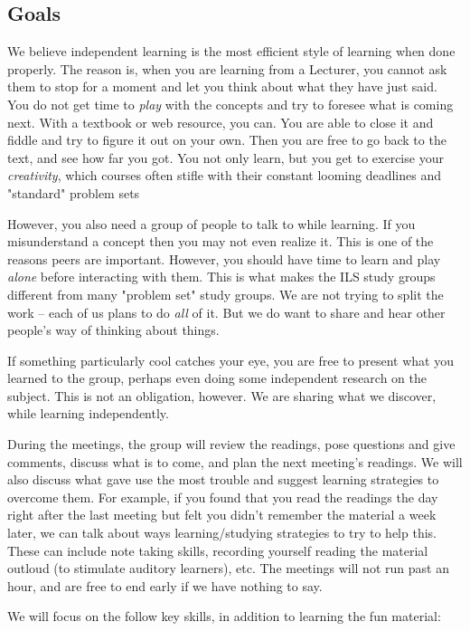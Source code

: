 \documentclass[mpinclude=true]{scrartcl}
\begin{document}
\subsection{Goals}


We believe independent learning is the most efficient style of
learning when done properly.  The reason is, when you are learning
from a Lecturer, you cannot ask them to stop for a moment and let you
think about what they have just said.  You do not get time to \emph{play}
with the concepts and try to foresee what is coming next.  With a
textbook or web resource, you can.  You are able to close it and
fiddle and try to figure it out on your own.  Then you are free to go
back to the text, and see how far you got.  You not only learn, but
you get to exercise your \emph{creativity}, which courses often stifle with
their constant looming deadlines and "standard" problem sets

However, you also need a group of people to talk to while learning.
If you misunderstand a concept then you may not even realize it.  This
is one of the reasons peers are important.  However, you should have
time to learn and play \emph{alone} before interacting with them.  This is
what makes the ILS study groups different from many "problem set"
study groups.  We are not trying to split the work -- each of us plans
to do \emph{all} of it.  But we do want to share and hear other people's
way of thinking about things.

If something particularly cool catches your eye, you are free to
present what you learned to the group, perhaps even doing some
independent research on the subject.  This is not an obligation,
however.  We are sharing what we discover, while learning
independently.

During the meetings, the group will review the readings, pose
questions and give comments, discuss what is to come, and plan the
next meeting's readings.  We will also discuss what gave use the most
trouble and suggest learning strategies to overcome them.  For
example, if you found that you read the readings the day right after
the last meeting but felt you didn't remember the material a week
later, we can talk about ways learning/studying strategies to try to
help this.  These can include note taking skills, recording yourself
reading the material outloud (to stimulate auditory learners), etc.
The meetings will not run past an hour, and are free to end early if
we have nothing to say.

We will focus on the follow key skills, in addition to learning the
fun material:
\end{document}
